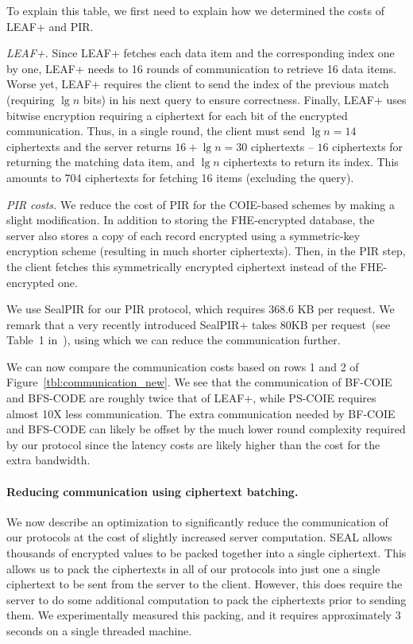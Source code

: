 To explain this table, we first need to explain how we determined the costs of LEAF+ and PIR.

\BI
\item {\it LEAF+.}
Since LEAF+ fetches each data item and the corresponding index one by
one, LEAF+ needs to 16 rounds of communication to retrieve 16 data
items. Worse yet, LEAF+ requires the client to send the index of the
previous match (requiring $\lg{n}$ bits) in his next query to ensure
correctness.  Finally, LEAF+ uses bitwise encryption requiring a
ciphertext for each bit of the encrypted communication.  Thus, in a
single round, the client must send $\lg n=14$ ciphertexts and the server
returns $16+\lg n = 30$ ciphertexts -- $16$ ciphertexts for returning
the matching data item, and $\lg n$ ciphertexts to return its index.
This amounts to 704 ciphertexts for fetching 16 items (excluding the
query).    

\item {\it PIR costs.}
We reduce the cost of PIR for the COIE-based schemes by making a slight modification.
In addition to storing the FHE-encrypted database, the server also stores a copy
of each record encrypted using a symmetric-key encryption scheme (resulting in much
shorter ciphertexts).  Then, in the PIR step, the client fetches this symmetrically encrypted ciphertext 
instead of the FHE-encrypted one.

%
We use SealPIR for our PIR protocol, which requires 368.6 KB per request.
We remark that a very recently introduced SealPIR+ takes 80KB per
request~(see Table~1 in~\cite{MulPIR}), using which we can reduce the
communication further.
\EI

We can now compare the communication costs based on rows 1 and 2 of
Figure~\ref{tbl:communication_new}.  We see that the communication of
BF-COIE and BFS-CODE are roughly twice that of LEAF+, while PS-COIE
requires almost 10X less communication.  The extra communication needed
by BF-COIE and BFS-CODE can likely be offset by the much lower round
complexity required by our protocol since the latency costs are likely
higher than the cost for the extra bandwidth.

\paragraph{Reducing communication using ciphertext batching.}
We now describe an optimization to significantly reduce the
communication of our protocols at the cost of slightly increased server
computation.  SEAL allows thousands of encrypted values to be packed
together into a single ciphertext.  This allows us to pack the
ciphertexts in all of our protocols into just one a single ciphertext to
be sent from the server to the client.  However, this does require the
server to do some additional computation to pack the ciphertexts prior
to sending them.  We experimentally measured this packing, and it requires
approximately 3 seconds on a single threaded machine.

